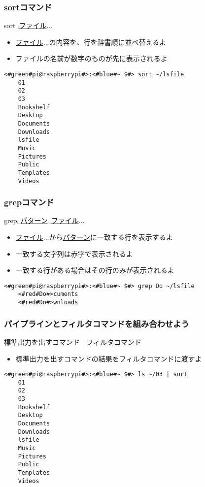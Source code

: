 \begin{frame}[fragile]
    \frametitle{sortコマンド}
    sort␣\underline{ファイル}$\ldots$
    \begin{itemize}
        \item \underline{ファイル}$\ldots$の内容を、行を辞書順に並べ替えるよ
        \item ファイルの名前が数字のものが先に表示されるよ
    \end{itemize}
    \begin{lstlisting}[title=sortコマンドの実行例, label=sort_example]
    <#green#pi@raspberrypi#>:<#blue#~ $#> sort ~/lsfile
    01
    02
    03
    Bookshelf
    Desktop
    Documents
    Downloads
    lsfile
    Music
    Pictures
    Public
    Templates
    Videos
    \end{lstlisting}
\end{frame}

\begin{frame}[fragile]
    \frametitle{grepコマンド}
    grep␣\underline{パターン}␣\underline{ファイル}$\ldots$
    \begin{itemize}
        \item \underline{ファイル}$\ldots$から\underline{パターン}に一致する行を表示するよ
        \item 一致する文字列は赤字で表示されるよ
        \item 一致する行がある場合はその行のみが表示されるよ
    \end{itemize}
    \begin{lstlisting}[title=grepコマンドの実行例, label=grep_example]
    <#green#pi@raspberrypi#>:<#blue#~ $#> grep Do ~/lsfile
    <#red#Do#>cuments
    <#red#Do#>wnloads
    \end{lstlisting}
\end{frame}

\begin{frame}[fragile]
    \frametitle{パイプラインとフィルタコマンドを組み合わせよう}
    標準出力を出すコマンド | フィルタコマンド
    \begin{itemize}
        \item 標準出力を出すコマンドの結果をフィルタコマンドに渡すよ
    \end{itemize}
    \begin{lstlisting}[title=パイプラインを用いたsortコマンドの実行例, label=sort_example]
    <#green#pi@raspberrypi#>:<#blue#~ $#> ls ~/03 | sort
    01
    02
    03
    Bookshelf
    Desktop
    Documents
    Downloads
    lsfile
    Music
    Pictures
    Public
    Templates
    Videos
    \end{lstlisting}
\end{frame}

